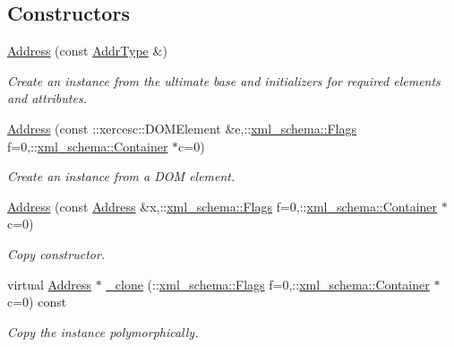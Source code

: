 \subsection*{Constructors}
\begin{DoxyCompactItemize}
\item 
\hypertarget{classopenstack_1_1xml_1_1Address_a377249bd145d9f4223cac09eda104202}{
\hyperlink{classopenstack_1_1xml_1_1Address_a377249bd145d9f4223cac09eda104202}{Address} (const \hyperlink{classopenstack_1_1xml_1_1Address_a768e0cf6818885dce0dc9df43a283011}{AddrType} \&)}
\label{classopenstack_1_1xml_1_1Address_a377249bd145d9f4223cac09eda104202}

\begin{DoxyCompactList}\small\item\em Create an instance from the ultimate base and initializers for required elements and attributes. \item\end{DoxyCompactList}\item 
\hyperlink{classopenstack_1_1xml_1_1Address_af6f9d83367849bf1d5caecdb8395e09e}{Address} (const ::xercesc::DOMElement \&e,::\hyperlink{namespacexml__schema_affb4c227cbd9aa7453dd1dc5a1401943}{xml\_\-schema::Flags} f=0,::\hyperlink{namespacexml__schema_a333dea2213742aea47a37532dec4ec27}{xml\_\-schema::Container} $\ast$c=0)
\begin{DoxyCompactList}\small\item\em Create an instance from a DOM element. \item\end{DoxyCompactList}\item 
\hyperlink{classopenstack_1_1xml_1_1Address_a38913bad97782852f3f7509174fd1919}{Address} (const \hyperlink{classopenstack_1_1xml_1_1Address}{Address} \&x,::\hyperlink{namespacexml__schema_affb4c227cbd9aa7453dd1dc5a1401943}{xml\_\-schema::Flags} f=0,::\hyperlink{namespacexml__schema_a333dea2213742aea47a37532dec4ec27}{xml\_\-schema::Container} $\ast$c=0)
\begin{DoxyCompactList}\small\item\em Copy constructor. \item\end{DoxyCompactList}\item 
virtual \hyperlink{classopenstack_1_1xml_1_1Address}{Address} $\ast$ \hyperlink{classopenstack_1_1xml_1_1Address_a3651c2eb719bde17741b8beee4b16b40}{\_\-clone} (::\hyperlink{namespacexml__schema_affb4c227cbd9aa7453dd1dc5a1401943}{xml\_\-schema::Flags} f=0,::\hyperlink{namespacexml__schema_a333dea2213742aea47a37532dec4ec27}{xml\_\-schema::Container} $\ast$c=0) const 
\begin{DoxyCompactList}\small\item\em Copy the instance polymorphically. \item\end{DoxyCompactList}\end{DoxyCompactItemize}


